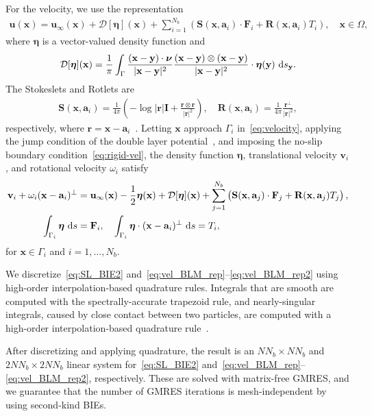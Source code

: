 \documentclass[prb,preprint,showpacs,preprintnumbers,amsmath,amssymb,longbibliography]{revtex4-1}
\renewcommand{\aa}{\mathbf{a}}
\newcommand{\DD}{\mathcal{D}}
\newcommand{\eeta}{\boldsymbol{\eta}}
\newcommand{\FF}{\mathbf{F}}
\newcommand{\nnu}{\boldsymbol{\nu}}
\newcommand{\rr}{\mathbf{r}}
\newcommand{\RR}{\mathbf{R}}
\renewcommand{\SS}{\mathbf{S}}
\newcommand{\xx}{\mathbf{x}}
\newcommand{\uu}{\mathbf{u}}
\renewcommand{\vv}{\mathbf{v}}
\newcommand{\yy}{\mathbf{y}}
\begin{document}
For the velocity, we use the representation
\begin{align}
  \label{eq:velocity}
  \uu(\xx) = \uu_\infty(\xx) + \DD[\eeta](\xx) + 
    \sum_{i=1}^{N_b} \left(\SS(\xx,\aa_i) \cdot \FF_i + 
    \RR(\xx,\aa_i) T_i\right), \quad \xx \in \Omega,
\end{align}
where $\eeta$ is a vector-valued density function and
\begin{align}
  \DD[\eeta](\xx) = \frac{1}{\pi} \int_{\Gamma} 
    \frac{(\xx - \yy) \cdot \nnu}{|\xx - \yy|^2}
    \frac{(\xx - \yy) \otimes (\xx - \yy)}{|\xx - \yy|^2}
    \cdot \eeta(\yy)\, \dif s_\yy.
\end{align}
The Stokeslets and Rotlets are
\begin{align}
  \SS(\xx,\aa_i) = \frac{1}{4\pi} \left(-\log |\rr|\mathbf{I} +
    \frac{\rr \otimes \rr}{|\rr|^2}\right), \quad 
  \RR(\xx,\aa_i) = \frac{1}{4\pi} \frac{\rr^\perp}{|\rr|^2}, 
\end{align}
respectively, where $\rr = \xx - \aa_i$~\cite{pow-mir1987}. Letting
$\xx$ approach $\Gamma_i$ in~\eqref{eq:velocity}, applying the jump
condition of the double layer potential~\cite{poz1992}, and imposing the
no-slip boundary condition~\eqref{eq:rigid-vel}, the density function
$\eeta$, translational velocity $\vv_i$, and rotational velocity
$\omega_i$ satisfy
\begin{alignat}{3}
  \label{eq:vel_BLM_rep}
  \vv_i + \omega_i (\xx - \aa_i)^\perp &= \uu_\infty(\xx)
    -\frac{1}{2} \eeta(\xx) + \DD[\eeta](\xx) 
    + \sum_{j=1}^{N_b} 
    \left(\SS(\xx,\aa_j) \cdot \FF_j + \RR(\xx,\aa_j) T_j\right),\\
  \label{eq:vel_BLM_rep2}
  \int_{\Gamma_i} \eeta \, \dif s &= \mathbf{F}_i, \quad
  \int_{\Gamma_i} \eeta \cdot (\xx-\aa_i)^\perp \, \dif s = T_i,
\end{alignat}
for $\xx \in \Gamma_i$ and $i = 1,\dots,N_b$.

We discretize~\eqref{eq:SL_BIE2}
and~\eqref{eq:vel_BLM_rep}--\eqref{eq:vel_BLM_rep2} using high-order
interpolation-based quadrature rules.  Integrals that are smooth are
computed with the spectrally-accurate trapezoid rule, and
nearly-singular integrals, caused by close contact between two
particles, are computed with a high-order interpolation-based quadrature
rule~\cite{qua-bir2014}.


After discretizing and applying quadrature, the result is an $NN_b
\times NN_b$ and $2NN_b \times 2NN_b$ linear system
for~\eqref{eq:SL_BIE2}
and~\eqref{eq:vel_BLM_rep}--\eqref{eq:vel_BLM_rep2}, respectively.
These are solved with matrix-free GMRES, and we guarantee that the
number of GMRES iterations is mesh-independent by using second-kind
BIEs.
\end{document}
